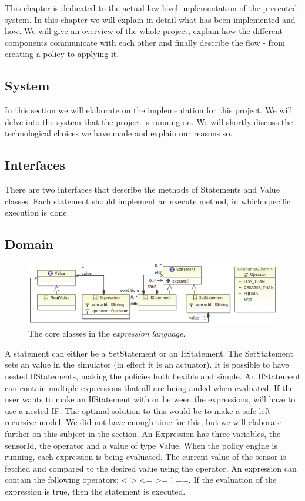 This chapter is dedicated to the actual low-level implementation of the presented system. In this chapter we will explain in detail what has been implemented and how. We will give an overview of the whole project, explain how the different components communicate with each other and finally describe the flow - from creating a policy to applying it. 

\subsection{System}
In this section we will elaborate on the implementation for this project. We will delve into the system that the project is running on. We will shortly discuss the technological choices we have made and explain our reasons so.

\subsection{Interfaces}
There are two interfaces that describe the methods of Statements and Value classes. Each statement should implement an execute method, in which specific execution is done. 
\subsection{Domain}
\begin{figure}
	\centering
    \includegraphics[scale=0.55]{chapters/implementation-model-expression-language.png} 
	\caption{The core classes in the \textit{expression language}.}
	\label{fig:ecore-sensors-actuators}
\end{figure}

A statement can either be a SetStatement or an IfStatement. The SetStatement sets an value in the simulator (in effect it is an actuator). It is possible to have nested IfStatements, making the policies both flexible and simple. An IfStatement can contain multiple expressions that all are being anded when evaluated. If the user wants to make an IfStatement with or between the expressions, will have to use a nested IF. The optimal solution to this would be to make a safe left-recursive model. We did not have enough time for this, but we will elaborate further on this subject in the  section. 
An Expression has three variables, the sensorId, the operator and a value of type Value. When the policy engine is running, each expression is being evaluated. The current value of the sensor is fetched and compared to the desired value using the operator. An expression can contain the following operators; < > <= >= ! ==. 
If the evaluation of the expression is true, then the statement is executed.

